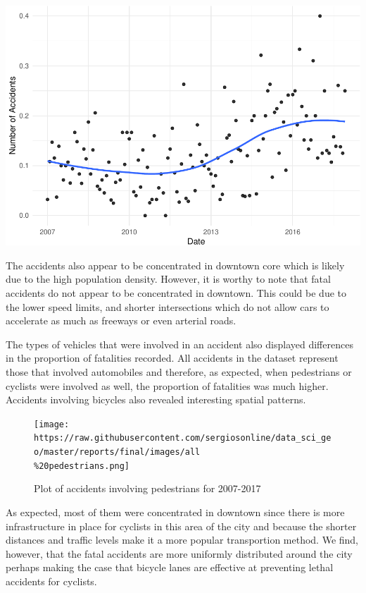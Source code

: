 \documentclass[]{article}
\begin{document}
\includegraphics{Project_II-Final-20190404_files/figure-latex/unnamed-chunk-5-2.pdf}

The accidents also appear to be concentrated in downtown core which is
likely due to the high population density. However, it is worthy to note
that fatal accidents do not appear to be concentrated in downtown. This
could be due to the lower speed limits, and shorter intersections which
do not allow cars to accelerate as much as freeways or even arterial
roads.

The types of vehicles that were involved in an accident also displayed
differences in the proportion of fatalities recorded. All accidents in
the dataset represent those that involved automobiles and therefore, as
expected, when pedestrians or cyclists were involved as well, the
proportion of fatalities was much higher. Accidents involving bicycles
also revealed interesting spatial patterns.

\begin{figure}
\centering
\texttt{[image: https://raw.githubusercontent.com/sergiosonline/data\_sci\_geo/master/reports/final/images/all\\\%20pedestrians.png]}
\caption{Plot of accidents involving pedestrians for 2007-2017}
\end{figure}

As expected, most of them were concentrated in downtown since there is
more infrastructure in place for cyclists in this area of the city and
because the shorter distances and traffic levels make it a more popular
transportion method. We find, however, that the fatal accidents are more
uniformly distributed around the city perhaps making the case that
bicycle lanes are effective at preventing lethal accidents for cyclists.
\end{document}
